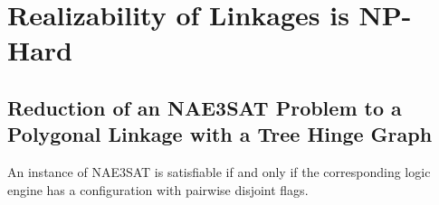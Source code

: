 \section{Realizability of Linkages is NP-Hard}
\subsection{Reduction of an NAE3SAT Problem to a Polygonal Linkage with a Tree Hinge Graph}
\begin{thm}
An instance of NAE3SAT is satisfiable if and only if the corresponding logic engine has a configuration with pairwise disjoint flags.
\end{thm}

